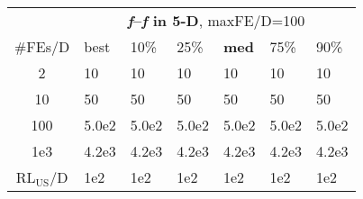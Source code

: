 \begin{tabular}{c|llllll}
 & \multicolumn{6}{|c}{\textbf{\textit{f}\raisebox{-0.35ex}{1}--\textit{f}\raisebox{-0.35ex}{1} in 5-D}, maxFE/D=100}\\
\#FEs/D & best & 10\% & 25\% & \textbf{med} & 75\% & 90\%\\
2 & 10 & 10 & 10 & 10 & 10 & 10\\
10 & 50 & 50 & 50 & 50 & 50 & 50\\
100 & 5.0e2 & 5.0e2 & 5.0e2 & 5.0e2 & 5.0e2 & 5.0e2\\
1e3 & 4.2e3 & 4.2e3 & 4.2e3 & 4.2e3 & 4.2e3 & 4.2e3\\
$\text{RL}_{\text{US}}$/D & 1e2 & 1e2 & 1e2 & 1e2 & 1e2 & 1e2
\end{tabular}
